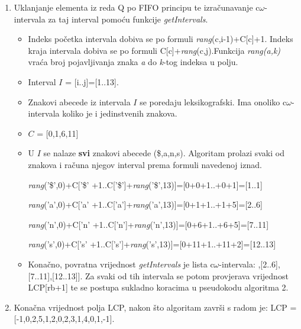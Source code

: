 \documentclass[times, utf8, seminar]{fer}
\begin{document}
\begin{enumerate}
\begin{enumerate}
\begin{itemize}
   \end{itemize}
   \item Uklanjanje elementa iz reda Q po FIFO principu te izračunavanje c$\omega$-intervala za taj interval pomoću funkcije \textit{getIntervals}.
   \begin{itemize}
   \item Indeks početka intervala dobiva se po formuli \textit{rang}(c,i-1)+C[c]+1. Indeks kraja intervala dobiva se po formuli C[c]+\textit{rang}(c,j).Funkcija \textit{rang(a,k)} vraća broj pojavljivanja znaka \textit{a} do \textit{k}-tog indeksa u polju. 
   \item Interval $I$ = [i..j]=[1..13]. 
   \item Znakovi abecede iz intervala $I$ se poredaju leksikografski. Ima onoliko c$\omega$-intervala koliko je i jedinstvenih znakova.
   \item $C$ = [0,1,6,11]
   \item U $I$ se nalaze \textbf{svi} znakovi abecede (\$,a,n,s). Algoritam prolazi svaki od znakova i računa njegov interval prema formuli navedenoj iznad.
   \item  [\textit{rang}('\$',0)+C['\$']+1..C['\$']+\textit{rang}('\$',13)]=[0+0+1..+0+1]=[1..1]
   \item [\textit{rang}('a',0)+C['a']+1..C['a']+\textit{rang}('a',13)]=[0+1+1..+1+5]=[2..6]
   \item
   [\textit{rang}('n',0)+C['n']+1..C['n']+\textit{rang}('n',13)]=[0+6+1..+6+5]=[7..11]
   \item
   [\textit{rang}('s',0)+C['s']+1..C['s']+\textit{rang}('s',13)]=[0+11+1..+11+2]=[12..13]
   \item Konačno, povratna vrijednost \textit{getIntervals} je lista c$\omega$-intervala: \newline [[1..1],[2..6],[7..11],[12..13]]. Za svaki od tih intervala se potom provjerava vrijednost LCP[rb+1] te se postupa sukladno koracima u pseudokodu algoritma 2.
   \end{itemize}
     \item Konačna vrijednost polja LCP, nakon što algoritam završi s radom je: 
       	LCP = [-1,0,2,5,1,2,0,2,3,1,4,0,1,-1].
  \end{enumerate}

\end{enumerate}
\end{document}
